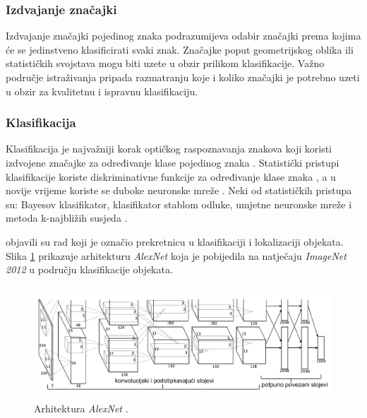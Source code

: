 \documentclass[times, utf8, zavrsni]{fer}
\begin{document}
\pagebreak

\subsubsection{Izdvajanje značajki}
Izdvajanje značajki pojedinog znaka podrazumijeva odabir značajki prema kojima
će se jedinstveno klasificirati svaki znak. Značajke poput geometrijskog oblika
ili statističkih svojstava mogu biti uzete u obzir prilikom klasifikacije.
Važno područje istraživanja pripada razmatranju koje i koliko značajki je
potrebno uzeti u obzir za kvalitetnu i ispravnu klasifikaciju.
\citep{DBLP:journals/corr/abs-1710-05703}


\subsubsection{Klasifikacija}
Klasifikacija je najvažniji korak optičkog raspoznavanja znakova
\citep{verma2012survey} \citep{zhu2016novel} koji koristi izdvojene značajke za
određivanje klase pojedinog znaka \citep{lehal1999feature}
\citep{kaur2016survey}. Statistički pristupi klasifikacije koriste
diskriminativne funkcije za određivanje klase znaka
\citep{DBLP:journals/corr/abs-1710-05703}, a u novije vrijeme koriste se duboke
neuronske mreže \citep{Jurin:2017:Master}. Neki od statističkih pristupa su:
Bayesov klasifikator, klasifikator stablom odluke, umjetne neuronske mreže i
metoda k-najbližih susjeda \citep{DBLP:journals/corr/abs-1710-05703}.

\citep{krizhevsky2012imagenet} objavili su rad koji je označio prekretnicu u
klasifikaciji i lokalizaciji objekata. Slika
\ref{fig:deep-example-01} prikazuje arhitekturu \emph{AlexNet} koja je
pobijedila na natječaju \emph{ImageNet 2012} u području klasifikacije objekata.
\citep{Jurin:2017:Master}

\begin{figure}[!htb]
    \centering
    \includegraphics[height=4.2cm]{images/deep-example-01.png}
    \caption{Arhitektura \emph{AlexNet} \citep{Jurin:2017:Master}.}
    \label{fig:deep-example-01}
\end{figure}
\end{document}
